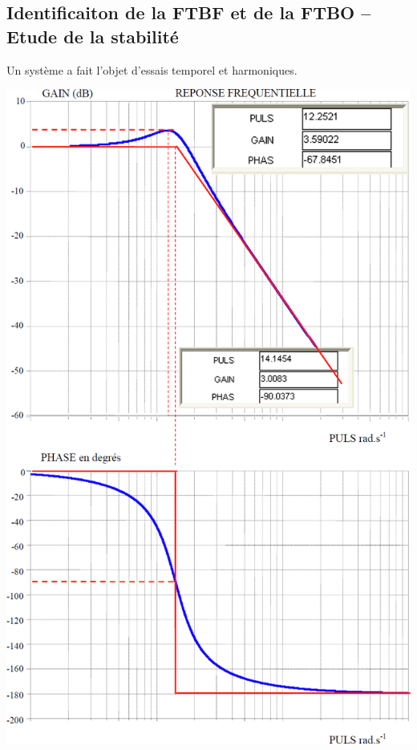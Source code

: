 \documentclass[10pt,fleqn]{article} %
\begin{document}
\def\pathfig{images}

\vspace{6cm}
\pagestyle{fancy}
\thispagestyle{plain}

\def\columnseprulecolor{\color{ocre}}
\setlength{\columnseprule}{0.4pt} 

\def\pathfig{images}

\ifprof
\else
\begin{multicols}{2}
\fi
\subsection*{Identificaiton de la FTBF et de la FTBO -- Etude de la stabilité}
Un système a fait l’objet d’essais temporel et harmoniques.

\begin{center}
\includegraphics[width=\linewidth]{images/fig_03}
\end{center}



\end{multicols}
\end{document}
